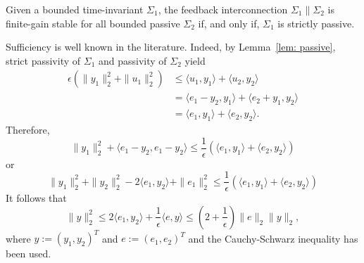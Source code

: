 \documentclass{ifacconf}
\theoremstyle{definition}
\begin{document}
\begin{thm} \label{thm: passive}
  Given a bounded time-invariant $\Sigma_1$, the feedback interconnection $\Sigma_1 \| \Sigma_2$ is finite-gain stable for all bounded passive $\Sigma_2$ if, and only if,
  $\Sigma_1$ is strictly passive.
\end{thm}

\begin{pf}
 Sufficiency is well known in the literature. Indeed, by Lemma~\ref{lem: passive}, strict passivity of $\Sigma_1$ and passivity of $\Sigma_2$ yield
\begin{align*}
\epsilon (\|y_1\|_2^2 + \|u_1\|_2^2) & \leq \langle u_1, y_1 \rangle + \langle u_2, y_2 \rangle \\
& = \langle e_1 - y_2, y_1 \rangle + \langle e_2 + y_1, y_2 \rangle \\
& = \langle e_1, y_1 \rangle + \langle e_2, y_2 \rangle.
\end{align*}
Therefore,
\[
\|y_1\|_2^2 + \langle e_1 - y_2, e_1 - y_2 \rangle \leq \frac{1}{\epsilon} (\langle e_1, y_1 \rangle + \langle e_2, y_2 \rangle)
\]
or
\[
\|y_1\|_2^2 + \|y_2\|_2^2 -2 \langle e_1, y_2 \rangle + \|e_1\|_2^2 \leq \frac{1}{\epsilon} (\langle e_1, y_1 \rangle + \langle e_2, y_2 \rangle)
\]
It follows that
\[
\|y\|_2^2 \leq 2 \langle e_1, y_2 \rangle + \frac{1}{\epsilon} \langle e, y \rangle \leq \left(2 + \frac{1}{\epsilon}\right) \|e\|_2\|y\|_2,
\]
where $y := (y_1, y_2)^T$ and $e := (e_1, e_2)^T$ and the Cauchy-Schwarz inequality has been used.


\end{pf}
\end{document}
